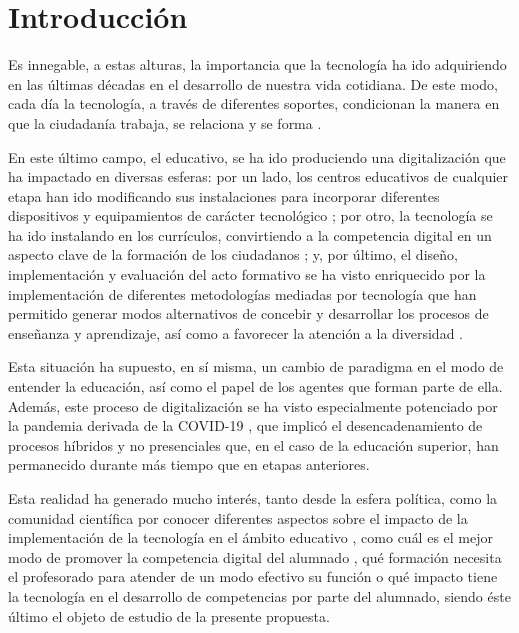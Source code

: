 \section{Introducción}\label{sec-introducción}

Es innegable, a estas alturas, la importancia que la tecnología ha ido
adquiriendo en las últimas décadas en el desarrollo de nuestra vida
cotidiana. De este modo, cada día la tecnología, a través de diferentes
soportes, condicionan la manera en que la ciudadanía trabaja, se
relaciona y se forma \cite{gabarda2021}.

En este último campo, el educativo, se ha ido produciendo una
digitalización que ha impactado en diversas esferas: por un lado, los
centros educativos de cualquier etapa han ido modificando sus
instalaciones para incorporar diferentes dispositivos y equipamientos de
carácter tecnológico \cite{area2020}; por otro, la tecnología se ha
ido instalando en los currículos, convirtiendo a la competencia digital
en un aspecto clave de la formación de los ciudadanos \cite{hernandez2023}; y, por último, el diseño, implementación y evaluación
del acto formativo se ha visto enriquecido por la implementación de
diferentes metodologías mediadas por tecnología que han permitido
generar modos alternativos de concebir y desarrollar los procesos de
enseñanza y aprendizaje, así como a favorecer la atención a la
diversidad \cite{lopezgomez2022,romerorodrigo2021}.

Esta situación ha supuesto, en sí misma, un cambio de paradigma en el
modo de entender la educación, así como el papel de los agentes que
forman parte de ella. Además, este proceso de digitalización se ha visto
especialmente potenciado por la pandemia derivada de la COVID-19
\cite{marinsuelves2023}, que implicó el desencadenamiento de
procesos híbridos y no presenciales que, en el caso de la educación
superior, han permanecido durante más tiempo que en etapas anteriores.

Esta realidad ha generado mucho interés, tanto desde la esfera política,
como la comunidad científica por conocer diferentes aspectos sobre el
impacto de la implementación de la tecnología en el ámbito educativo
\cite{aguilar2023}, como cuál es el mejor modo de promover la
competencia digital del alumnado \cite{colomo2023}, qué formación
necesita el profesorado para atender de un modo efectivo su función \cite{mas2023} o qué impacto tiene la tecnología en el desarrollo de
competencias por parte del alumnado, siendo éste último el objeto de
estudio de la presente propuesta.